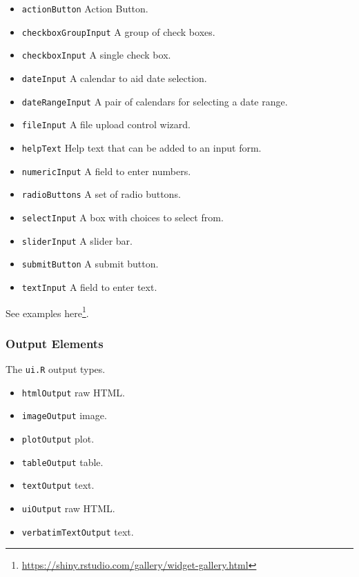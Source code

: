\documentclass[]{book}
\providecommand{\tightlist}{%
  \setlength{\itemsep}{0pt}\setlength{\parskip}{0pt}}
\renewcommand{\href}[2]{#2\footnote{\url{#1}}}
\theoremstyle{definition}
\theoremstyle{definition}
\theoremstyle{definition}
\theoremstyle{remark}
\begin{document}
\begin{itemize}
\tightlist
\item
  \texttt{actionButton} Action Button.
\item
  \texttt{checkboxGroupInput} A group of check boxes.
\item
  \texttt{checkboxInput} A single check box.
\item
  \texttt{dateInput} A calendar to aid date selection.
\item
  \texttt{dateRangeInput} A pair of calendars for selecting a date range.
\item
  \texttt{fileInput} A file upload control wizard.
\item
  \texttt{helpText} Help text that can be added to an input form.
\item
  \texttt{numericInput} A field to enter numbers.
\item
  \texttt{radioButtons} A set of radio buttons.
\item
  \texttt{selectInput} A box with choices to select from.
\item
  \texttt{sliderInput} A slider bar.
\item
  \texttt{submitButton} A submit button.
\item
  \texttt{textInput} A field to enter text.
\end{itemize}

See examples \href{https://shiny.rstudio.com/gallery/widget-gallery.html}{here}.

\hypertarget{output-elements}{%
\subsubsection{Output Elements}\label{output-elements}}

The \texttt{ui.R} output types.

\begin{itemize}
\tightlist
\item
  \texttt{htmlOutput} raw HTML.
\item
  \texttt{imageOutput} image.
\item
  \texttt{plotOutput} plot.
\item
  \texttt{tableOutput} table.
\item
  \texttt{textOutput} text.
\item
  \texttt{uiOutput} raw HTML.
\item
  \texttt{verbatimTextOutput} text.
\end{itemize}
\end{document}
